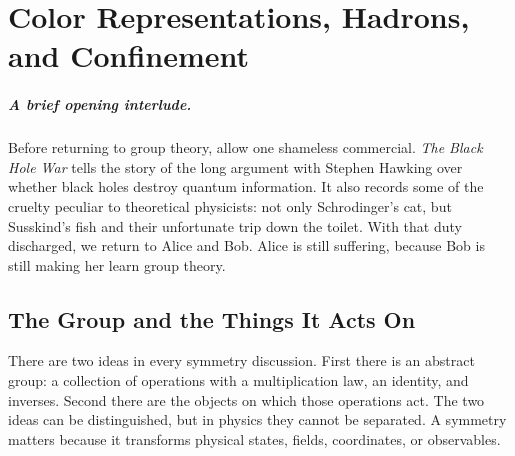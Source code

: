 \chapter{Color Representations, Hadrons, and Confinement}

\paragraph{A brief opening interlude.}
Before returning to group theory, allow one shameless commercial. \emph{The
Black Hole War} tells the story of the long argument with Stephen Hawking over
whether black holes destroy quantum information. It also records some of the
cruelty peculiar to theoretical physicists: not only Schrodinger's cat, but
Susskind's fish and their unfortunate trip down the toilet. With that duty
discharged, we return to Alice and Bob. Alice is still suffering, because Bob
is still making her learn group theory.


\section{The Group and the Things It Acts On}

There are two ideas in every symmetry discussion. First there is an abstract
group: a collection of operations with a multiplication law, an identity, and
inverses. Second there are the objects on which those operations act. The two
ideas can be distinguished, but in physics they cannot be separated. A
symmetry matters because it transforms physical states, fields, coordinates,
or observables.

\begin{classroomqa}
\end{classroomqa}

